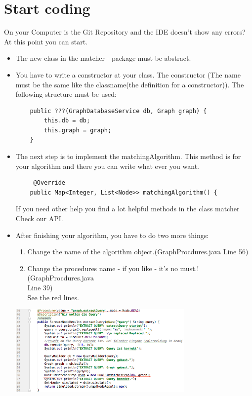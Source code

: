 \section{Start coding}\label{sec:startProgramming}
On your Computer is the \glqq Git Repository\grqq{} and the IDE doesn't show any errors? At this point you can start.
\begin{itemize}
	\item The new class in the \glqq matcher - package \grqq{} must be abstract.
	\item You have to write a constructor at your class. The constructor (The name must be the same like the classname(the definition for a constructor)). The following structure must be used: \\
	\lstset{language=Java}
	\begin{lstlisting}
	public ???(GraphDatabaseService db, Graph graph) {
		this.db = db;
		this.graph = graph;
	}
	\end{lstlisting}
	\item The next step is to implement the \glqq matchingAlgorithm\grqq{}. This method is for your algorithm and there you can write what ever you want. \\
	\lstset{language=Java}
	\begin{lstlisting} 
	 @Override
	public Map<Integer, List<Node>> matchingAlgorithm() {
	\end{lstlisting} 
	If you need other help you find a lot helpful methods in the class \glqq matcher \grqq{} Check our API.
	\item After finishing your algorithm, you have to do two more things: \\ 
	\begin{enumerate}
		\item Change the name of the algorithm object.(GraphProcdures.java Line 56) \\
		\item Change the procedures name - if you like - it's no must.!(GraphProcdures.java \\
		Line 39) \\
	See the red lines.
	\end{enumerate}
	\begin{center}
		\includegraphics[width=9.0cm]{common/ChangeProcedures.png}\setlength{\unitlength}{1mm}
	\end{center}
\end{itemize}

